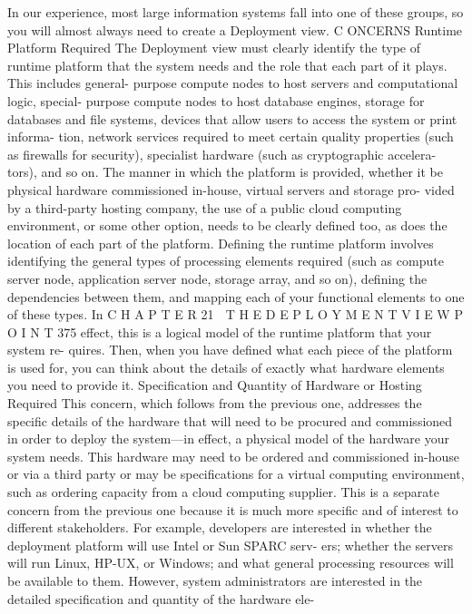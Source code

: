In our experience, most large information systems fall into one of these
groups, so you will almost always need to create a Deployment view.
C ONCERNS
Runtime Platform Required
The Deployment view must clearly identify the type of runtime platform that
the system needs and the role that each part of it plays. This includes general-
purpose compute nodes to host servers and computational logic, special-
purpose compute nodes to host database engines, storage for databases and
file systems, devices that allow users to access the system or print informa-
tion, network services required to meet certain quality properties (such as
firewalls for security), specialist hardware (such as cryptographic accelera-
tors), and so on. The manner in which the platform is provided, whether it be
physical hardware commissioned in-house, virtual servers and storage pro-
vided by a third-party hosting company, the use of a public cloud computing
environment, or some other option, needs to be clearly defined too, as does
the location of each part of the platform.
Defining the runtime platform involves identifying the general types of
processing elements required (such as compute server node, application
server node, storage array, and so on), defining the dependencies between
them, and mapping each of your functional elements to one of these types. In
C H A P T E R 21  T H E D E P L O Y M E N T V I E W P O I N T
 375
effect, this is a logical model of the runtime platform that your system re-
quires. Then, when you have defined what each piece of the platform is used
for, you can think about the details of exactly what hardware elements you
need to provide it.
Specification and Quantity of Hardware
or Hosting Required
This concern, which follows from the previous one, addresses the specific
details of the hardware that will need to be procured and commissioned in order
to deploy the system—in effect, a physical model of the hardware your system
needs. This hardware may need to be ordered and commissioned in-house or
via a third party or may be specifications for a virtual computing environment,
such as ordering capacity from a cloud computing supplier.
This is a separate concern from the previous one because it is much more
specific and of interest to different stakeholders. For example, developers are
interested in whether the deployment platform will use Intel or Sun SPARC serv-
ers; whether the servers will run Linux, HP-UX, or Windows; and what general
processing resources will be available to them. However, system administrators
are interested in the detailed specification and quantity of the hardware ele-
